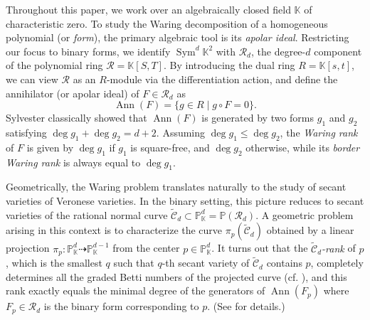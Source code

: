 \documentclass[a4paper, 11pt]{amsart}
\numberwithin{theorem}{section}
\theoremstyle{definition}
\numberwithin{equation}{section}
\DeclareMathOperator{\Ann}{\operatorname{Ann}}
\newcommand{\Sym}{\operatorname{Sym}}
\begin{document}
Throughout this paper, we work over an algebraically closed field $\mathbb{K}$ of characteristic zero.
To study the Waring decomposition of a homogeneous polynomial (or \emph{form}), the primary algebraic tool is its \emph{apolar ideal}.
Restricting our focus to binary forms, we identify $\Sym^d\mathbb{K}^2$ with $\mathcal{R}_d$, the degree-$d$ component of the polynomial ring $\mathcal{R}=\mathbb{K}[S,T]$.
By introducing the dual ring $R = \mathbb{K}[s,t]$, we can view $\mathcal{R}$ as an $R$-module via the differentiation action, and define the annihilator (or apolar ideal) of $F \in \mathcal{R}_d$ as 
\[
\Ann(F) = \{g \in R \mid g \circ F = 0\}.
\]
Sylvester classically showed that $\Ann(F)$ is generated by two forms $g_1$ and $g_2$ satisfying $\deg g_1 + \deg g_2 = d + 2$. 
Assuming $\deg g_1 \le \deg g_2$, the \emph{Waring rank} of $F$ is given by $\deg g_1$ if $g_1$ is square-free, and $\deg g_2$ otherwise, while its \emph{border Waring rank} is always equal to $\deg g_1$.

Geometrically, the Waring problem translates naturally to the study of secant varieties of Veronese varieties. 
In the binary setting, this picture reduces to secant varieties of the rational normal curve $\widetilde{\mathcal{C}}_d \subset \mathbb{P}_{\mathbb{K}}^d = \mathbb{P}(\mathcal{R}_d)$. 
A geometric problem arising in this context is to characterize the curve $\pi_{p}(\widetilde{\mathcal{C}}_d)$ obtained by a linear projection $\pi_p: \mathbb{P}_{\mathbb{K}}^d \dashrightarrow \mathbb{P}_{\mathbb{K}}^{d-1}$ from the center $p\in \mathbb{P}_{\mathbb{K}}^d$.
It turns out that the \emph{$\widetilde{\mathcal{C}}_d$-rank} of $p$, which is the smallest $q$ such that $q$-th secant variety of $\widetilde{\mathcal{C}}_d$ contains $p$, completely determines all the graded Betti numbers of the projected curve (cf. \cite{MR2299577}), and this rank exactly equals the minimal degree of the generators of $\Ann(F_p)$ where $F_p \in \mathcal{R}_d$ is the binary form corresponding to $p$. (See \cite[Section 2.2]{MR5047032} for details.)
\end{document}
